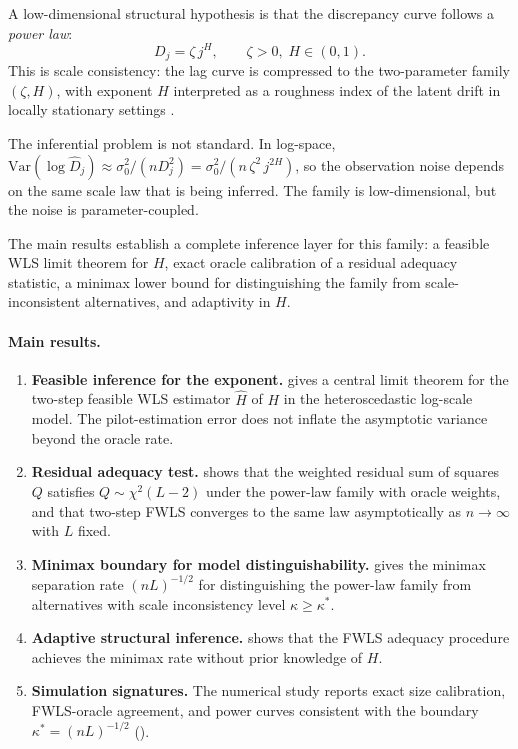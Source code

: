 \documentclass[10pt,a4paper,twocolumn]{article}
\newcommand{\Var}{\mathrm{Var}}
\newcommand{\Dhj}{\widehat{D}_j}
\newcommand{\Hhat}{\widehat{H}}
\begin{document}
A low-dimensional structural hypothesis is that the discrepancy curve follows
a \emph{power law}:
\begin{equation}
    D_j = \zeta\,j^H,\qquad \zeta > 0,\; H \in (0,1).
    \label{eq:power-law}
\end{equation}
This is scale consistency: the lag curve is compressed to the two-parameter
family $(\zeta, H)$, with exponent $H$ interpreted as a roughness index of
the latent drift in locally stationary settings \citep{Dahlhaus1997,Vogt2012,TinioAlayaBouzebda2025}.

The inferential problem is not standard.  In log-space,
$\Var(\log \Dhj) \approx \sigma_0^2/(n D_j^2) = \sigma_0^2 /(n\,\zeta^2\,j^{2H})$,
so the observation noise depends on the same scale law that is being
inferred.  The family is low-dimensional, but the noise is
parameter-coupled.

The main results establish a complete inference layer for this family: a
feasible WLS limit theorem for $H$, exact oracle calibration of a residual
adequacy statistic, a minimax lower bound for distinguishing the family from
scale-inconsistent alternatives, and adaptivity in $H$.

\paragraph{Main results.}
\begin{enumerate}[leftmargin=*,label=(\arabic*)]
\item \textbf{Feasible inference for the exponent.}  
gives a central limit theorem for the two-step feasible WLS estimator
$\Hhat$ of $H$ in the heteroscedastic log-scale model.  The
pilot-estimation error does not inflate the asymptotic variance beyond the
oracle rate.

\item \textbf{Residual adequacy test.}   shows that
the weighted residual sum of squares $Q$ satisfies $Q \sim \chi^2(L-2)$
under the power-law family with oracle weights, and that two-step FWLS
converges to the same law asymptotically as $n \to \infty$ with $L$ fixed.

\item \textbf{Minimax boundary for model distinguishability.}
 gives the minimax separation rate $(nL)^{-1/2}$ for
distinguishing the power-law family from alternatives with scale
inconsistency level $\kappa \geq \kappa^*$.

\item \textbf{Adaptive structural inference.}  
shows that the FWLS adequacy procedure achieves the minimax rate without
prior knowledge of $H$.

\item \textbf{Simulation signatures.}  The numerical study reports exact
size calibration, FWLS-oracle agreement, and power curves consistent with the
boundary $\kappa^* = (nL)^{-1/2}$ ().
\end{enumerate}
\end{document}
